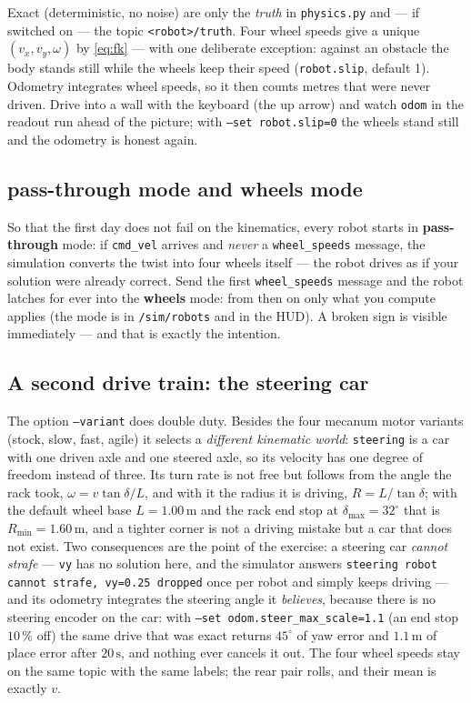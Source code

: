 \documentclass[12pt,a4paper]{scrartcl}
\newcommand{\thema}[1]{\texttt{#1}}
\newcommand{\ordner}[1]{\texttt{#1}}
\begin{document}
Exact (deterministic, no noise) are only the \emph{truth} in \ordner{physics.py} and
— if switched on — the topic \thema{<robot>/truth}.
Four wheel speeds give a unique
\((v_x,v_y,\omega)\) by \cref{eq:fk} — with one deliberate exception: against an obstacle the
body stands still while the wheels keep their speed (\thema{robot.slip}, default 1). Odometry
integrates wheel speeds, so it then counts metres that were never driven. Drive into a wall with
the keyboard (the up arrow) and watch \thema{odom} in the readout run ahead of the picture; with
\thema{--set robot.slip=0} the wheels stand still and the odometry is honest again.

\subsection{pass-through mode and wheels mode}
So that the first day does not fail on the kinematics, every robot starts in
\textbf{pass-through} mode: if \thema{cmd\_vel} arrives and \emph{never} a
\thema{wheel\_speeds} message, the simulation converts the twist into four wheels itself
— the robot drives as if your solution were already correct. Send the first
\thema{wheel\_speeds} message and the robot latches for ever into the
\textbf{wheels} mode: from then on only what you compute applies (the mode is in
\thema{/sim/robots} and in the HUD). A broken sign is visible immediately —
and that is exactly the intention.

\subsection{A second drive train: the steering car}
\label{sec:steering}
The option \thema{--variant} does double duty. Besides the four mecanum motor variants
(stock, slow, fast, agile) it selects a \emph{different kinematic world}: \thema{steering} is a car
with one driven axle and one steered axle, so its velocity has one degree of freedom instead of
three. Its turn rate is not free but follows from the angle the rack took,
\(\omega = v \tan\delta / L\), and with it the radius it is driving,
\(R = L/\tan\delta\); with the default wheel base \(L = 1.00\,\mathrm{m}\) and the rack end stop at
\(\delta_{\max} = 32^\circ\) that is \(R_{\min} = 1.60\,\mathrm{m}\), and a tighter corner is not a
driving mistake but a car that does not exist. Two consequences are the point of the exercise: a
steering car \emph{cannot strafe} — \thema{vy} has no solution here, and the simulator answers
\texttt{steering robot cannot strafe, vy=0.25 dropped} once per robot and simply keeps driving — and
its odometry integrates the steering angle it \emph{believes}, because there is no steering encoder on
the car: with \thema{--set odom.steer\_max\_scale=1.1} (an end stop \(10\,\%\) off) the same drive
that was exact returns \(45^\circ\) of yaw error and \(1.1\,\mathrm{m}\) of place error after
\(20\,\mathrm{s}\), and nothing ever cancels it out. The four wheel speeds stay on the same topic with
the same labels; the rear pair rolls, and their mean is exactly \(v\).
\end{document}
